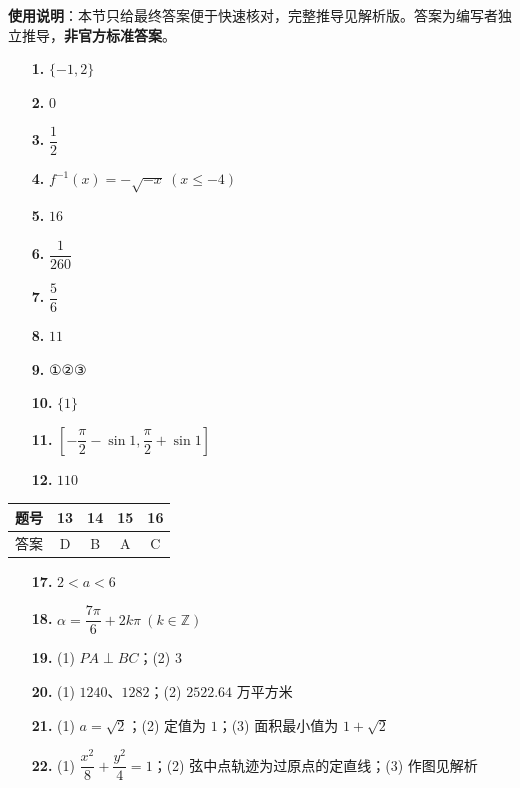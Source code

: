 
\begin{gknotice}
\textbf{使用说明}：本节只给最终答案便于快速核对，完整推导见解析版。答案为编写者独立推导，\textbf{非官方标准答案}。
\end{gknotice}

\begin{itemize}[leftmargin=2.6em]
  \item[\textbf{1.}] $\{-1,2\}$
  \item[\textbf{2.}] $0$
  \item[\textbf{3.}] $\dfrac12$
  \item[\textbf{4.}] $f^{-1}(x)=-\sqrt{-x}\ (x\le-4)$
  \item[\textbf{5.}] $16$
  \item[\textbf{6.}] $\dfrac1{260}$
  \item[\textbf{7.}] $\dfrac56$
  \item[\textbf{8.}] $11$
  \item[\textbf{9.}] ①②③
  \item[\textbf{10.}] $\{1\}$
  \item[\textbf{11.}] $[-\dfrac\pi2-\sin1,\dfrac\pi2+\sin1]$
  \item[\textbf{12.}] $110$
\end{itemize}

\begin{center}\begin{tabular}{ccccc}
\toprule
题号 & 13 & 14 & 15 & 16 \\
\midrule
答案 & D & B & A & C \\
\bottomrule
\end{tabular}\end{center}

\begin{itemize}[leftmargin=2.6em]
  \item[\textbf{17.}] $2<a<6$
  \item[\textbf{18.}] $\alpha=\dfrac{7\pi}{6}+2k\pi\ (k\in\mathbb{Z})$
  \item[\textbf{19.}] (1) $PA\perp BC$；(2) $3$
  \item[\textbf{20.}] (1) $1240$、$1282$；(2) $2522.64$ 万平方米
  \item[\textbf{21.}] (1) $a=\sqrt2$；(2) 定值为 $1$；(3) 面积最小值为 $1+\sqrt2$
  \item[\textbf{22.}] (1) $\dfrac{x^2}{8}+\dfrac{y^2}{4}=1$；(2) 弦中点轨迹为过原点的定直线；(3) 作图见解析
\end{itemize}
